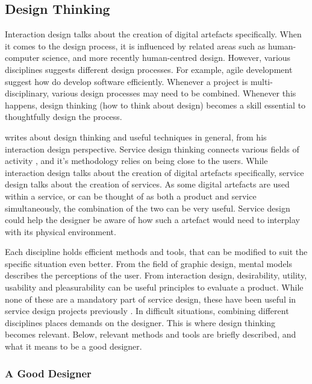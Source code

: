 \subsection{Design Thinking}

%

Interaction design talks about the creation of digital artefacts specifically. When it comes to the design process, it is influenced by related areas such as human-computer science, and more recently human-centred design. However, various disciplines suggests different design processes. For example, agile development suggest how do develop software efficiently. Whenever a project is multi-disciplinary, various design processes may need to be combined. Whenever this happens, design thinking (how to think about design) becomes a skill essential to thoughtfully design the process.

\cite{lowgren} writes about design thinking and useful techniques in general, from his interaction design perspective. Service design thinking connects various fields of activity \citep{stickdorn}, and it's methodology relies on being close to the users. While interaction design talks about the creation of digital artefacts specifically, service design talks about the creation of services. As some digital artefacts are used within a service, or can be thought of as both a product and service simultaneously, the combination of the two can be very useful. Service design could help the designer be aware of how such a artefact would need to interplay with its physical environment.

Each discipline holds efficient methods and tools, that can be modified to suit the specific situation even better. From the field of graphic design, mental models describes the perceptions of the user. From interaction design, desirability, utility, usability and pleasurability can be useful principles to evaluate a product. While none of these are a mandatory part of service design, these have been useful in service design projects previously \citep{stickdorn}. In difficult situations, combining different disciplines places demands on the designer. This is where design thinking becomes relevant. Below, relevant methods and tools are briefly described, and what it means to be a good designer.

\subsubsection{A Good Designer}\label{aGoodDesigner}

